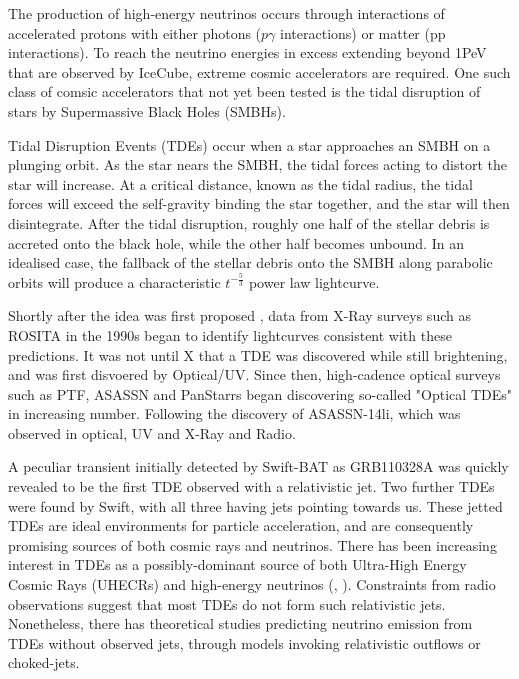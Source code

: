 \documentclass[twocolumn, tighten, linenumbers]{aastex62}
\begin{document}
The production of high-energy neutrinos occurs through interactions of accelerated protons with either photons ($p\gamma$ interactions) or matter (pp interactions). To reach the neutrino energies in excess extending beyond 1PeV that are observed by IceCube, extreme cosmic accelerators are required. One such class of comsic accelerators that not yet been tested is the tidal disruption of stars by Supermassive Black Holes (SMBHs).

Tidal Disruption Events (TDEs) occur when a star approaches an SMBH on a plunging orbit. As the star nears the SMBH, the tidal forces acting to distort the star will increase. At a critical distance, known as the tidal radius, the tidal forces will exceed the self-gravity binding the star together, and the star will then disintegrate. After the tidal disruption, roughly one half of the stellar debris is accreted onto the black hole, while the other half becomes unbound. In an idealised case, the fallback of the stellar debris onto the SMBH along parabolic orbits will produce a characteristic $t^{-\frac{5}{3}}$ power law lightcurve. 

Shortly after the idea was first proposed \cite{rees1988}, data from X-Ray surveys such as ROSITA in the 1990s began to identify lightcurves consistent with these predictions. It was not until X that a TDE was discovered while still brightening, and was first disvoered by Optical/UV. Since then, high-cadence optical surveys such as PTF, ASASSN and PanStarrs began discovering so-called "Optical TDEs" in increasing number. Following the discovery of ASASSN-14li, which was observed in optical, UV and X-Ray and Radio.

A peculiar transient initially detected by Swift-BAT as GRB110328A was quickly revealed to be the first TDE observed with a relativistic jet. Two further TDEs were found by Swift, with all three having jets pointing towards us. These jetted TDEs are ideal environments for particle acceleration, and are consequently promising sources of both cosmic rays and neutrinos. There has been increasing interest in TDEs as a possibly-dominant source of both Ultra-High Energy Cosmic Rays (UHECRs) and high-energy neutrinos (\cite{biehl18}, \cite{daifang16} \cite{murase16} \cite{winter17}). Constraints from radio observations suggest that most TDEs do not form such relativistic jets. Nonetheless, there has theoretical studies predicting neutrino emission from TDEs without observed jets, through models invoking relativistic outflows or choked-jets. 
\end{document}
